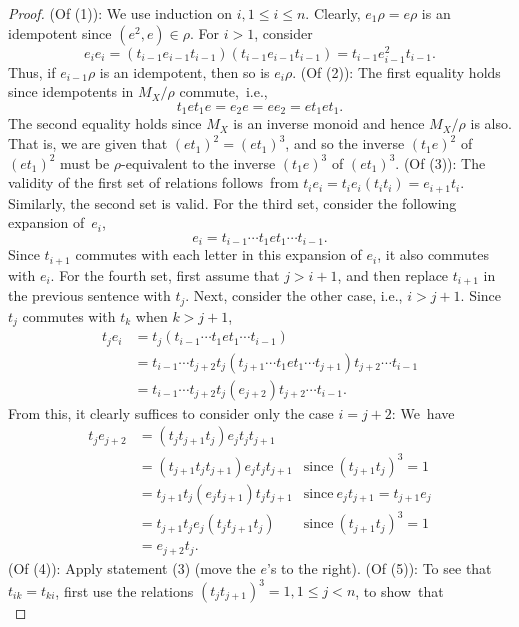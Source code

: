 \documentclass{surv-l}
\numberwithin{equation}{section}
\numberwithin{table}{section}
\numberwithin{figure}{section}
\theoremstyle{definition}
\begin{document}
\begin{proof} (Of (1)): We use induction on $i, 1\leq
i\leq n$. Clearly, $ e_{1}\rho=e\rho$ is an idempotent since
$(e^{2}, e)\in\rho$. For $i>1$, consider
\[
e_{i}e_{i}=(t_{i-1}e_{i-1}t_{i-1})(t_{i-1}e_{i-1}t_{i-1})=t_{i-1}e_{i-1}^{2}t_{i-1}.
\]
Thus, if $e_{i-1}\rho$ is an idempotent, then so is
$e_{i}\rho$. (Of (2)): The first equality holds since
idempotents in $M_{X}/\rho$ commute,~i.e.,
\[
t_{1}et_{1}e=e_{2}e=ee_{2}=et_{1}et_{1}.
\]
The second equality holds since $M_{X}$ is an inverse monoid
and hence $M_{X}/\rho$ is also. That is, we are given that
$(et_1)^{2}=(et_{1})^{3}$, and so the inverse $(t_{1}e)^{2}$
of $(et_{1})^{2}$ must be $\rho$-equivalent to the inverse
$(t_{1}e)^{3}$ of $(et_{1})^{3}$. (Of (3)): The validity of
the first set of relations follows~from
$t_{i}e_{i}=t_{i}e_{i}(t_{i}t_{i})=e_{i+1}t_{i}$. Similarly,
the second set is valid. For the third set, consider the
following expansion of~$e_{i}$,
\[
e_{i}=t_{i-1}\cdots t_{1}et_{1}\cdots t_{i-1}.
\]
Since $t_{i+1}$ commutes with each letter in this expansion of
$e_{i}$, it also commutes with $e_{i}$. For the fourth set,
first assume that $j>i+1$, and then replace $t_{i+1}$ in the
previous sentence with $t_{j}$. Next, consider the other case,
i.e., $i>j+1$. Since $t_{j}$ commutes with $t_{k}$ when $k>j+1$,
\begin{align*}
t_{j}e_{i}&=t_{j}(t_{i-1}\cdots t_{1}et_{1}\cdots t_{i-1}) \\
&=t_{i-1}\cdots t_{j+2}t_{j}(t_{j+1}\cdots t_{1}et_{1}\cdots t_{j+1})t_{j+2}\cdots t_{i-1} \\
&=t_{i-1}\cdots t_{j+2}t_{j}(e_{j+2})t_{j+2}\cdots t_{i-1}.
\end{align*}
From this, it clearly suffices to consider only the case
$i=j+2$: We~have
\[
\begin{array}{lll}
t_{j}e_{j+2} &=(t_{j}t_{j+1}t_{j})e_{j}t_{j}t_{j+1} & \\
&=(t_{j+1}t_{j}t_{j+1})e_{j}t_{j}t_{j+1} &\mathrm{since}\ (t_{j+1}t_{j})^{3}=1\\
&=t_{j+1}t_{j}(e_{j}t_{j+1})t_{j}t_{j+1} &\mathrm{since}\  e_{j}t_{j+1}=t_{j+1}e_{j} \\
&=t_{j+1}t_{j}e_{j}(t_{j}t_{j+1}t_{j}) &\mathrm{since}\ (t_{j+1}t_{j})^{3}=1 \\
&=e_{j+2}t_{j}. &
\end{array}
\]
(Of (4)): Apply statement (3) (move the $e$'s to the right). (Of
(5)): To see that $t_{ik}=t_{ki}$, first use the relations
$(t_{j}t_{j+1})^{3}=1,1\leq j<n$, to show~that
\begin{equation}\label{eq9.43.3}

\end{equation}
\end{proof}
\end{document}
